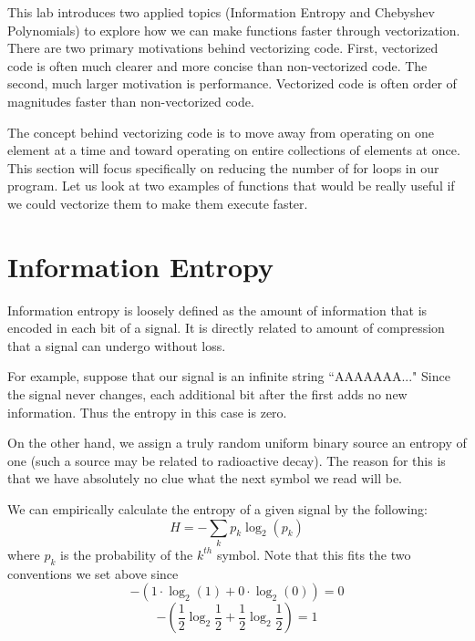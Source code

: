 

This lab introduces two applied topics (Information Entropy and Chebyshev Polynomials) to explore how we can make functions faster through vectorization. There are two primary motivations behind vectorizing code.  First, vectorized code is often much clearer and more concise than non-vectorized code.  The second, much larger motivation is performance.  Vectorized code is often order of magnitudes faster than non-vectorized code.

The concept behind vectorizing code is to move away from operating on one element at a time and toward operating on entire collections of elements at once.  This section will focus specifically on reducing the number of for loops in our program.  Let us look at two examples of functions that would be really useful if we could vectorize them to make them execute faster.

\section*{Information Entropy}

Information entropy is loosely defined as the amount of information that is encoded in each bit of a signal. It is directly related to amount of compression that a signal can undergo without loss.

For example, suppose that our signal is an infinite string ``AAAAAAA..." Since the signal never changes, each additional bit after the first adds no new information. Thus the entropy in this case is zero.

On the other hand, we assign a truly random uniform binary source an entropy of one (such a source may be related to radioactive decay). The reason for this is that we have absolutely no clue what the next symbol we read will be.

We can empirically calculate the entropy of a given signal by the following:
\begin{equation*}
H = -\sum_k{p_k \log_2(p_k)}
\end{equation*}
where $p_k$ is the probability of the $k^{th}$ symbol. Note that this fits the two conventions we set above since
\begin{equation*}
-(1\cdot\log_2(1) + 0\cdot\log_2(0)) = 0
\end{equation*}
\begin{equation*}
-(\frac{1}{2}\log_2\frac{1}{2} + \frac{1}{2}\log_2\frac{1}{2}) = 1
\end{equation*}

